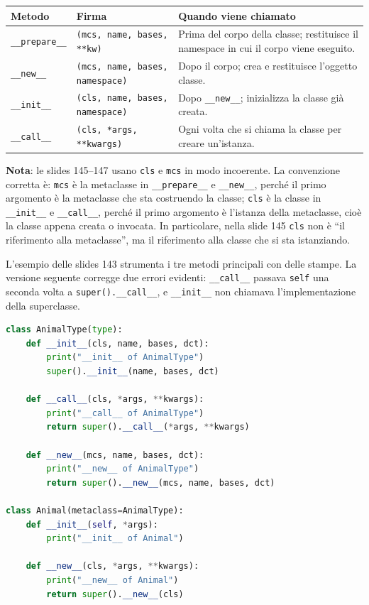 \documentclass[12pt]{extarticle}
\begin{document}
\begin{center}
\small
\begin{tabular}{p{3.4cm}p{6.2cm}p{5.0cm}}
    \toprule
    \textbf{Metodo} & \textbf{Firma} & \textbf{Quando viene chiamato} \\
    \midrule
    \texttt{\_\_prepare\_\_} & \texttt{(mcs, name, bases, **kw)} & Prima del corpo della classe; restituisce il namespace in cui il corpo viene eseguito. \\
    \addlinespace
    \texttt{\_\_new\_\_} & \texttt{(mcs, name, bases, namespace)} & Dopo il corpo; crea e restituisce l'oggetto classe. \\
    \addlinespace
    \texttt{\_\_init\_\_} & \texttt{(cls, name, bases, namespace)} & Dopo \texttt{\_\_new\_\_}; inizializza la classe già creata. \\
    \addlinespace
    \texttt{\_\_call\_\_} & \texttt{(cls, *args, **kwargs)} & Ogni volta che si chiama la classe per creare un'istanza. \\
    \bottomrule
\end{tabular}
\end{center}

\noindent \textbf{Nota}: le slides 145--147 usano \texttt{cls} e \texttt{mcs} in modo incoerente. La convenzione corretta è: \texttt{mcs} è la metaclasse in \texttt{\_\_prepare\_\_} e \texttt{\_\_new\_\_}, perché il primo argomento è la metaclasse che sta costruendo la classe; \texttt{cls} è la classe in \texttt{\_\_init\_\_} e \texttt{\_\_call\_\_}, perché il primo argomento è l'istanza della metaclasse, cioè la classe appena creata o invocata. In particolare, nella slide 145 \texttt{cls} non è ``il riferimento alla metaclasse'', ma il riferimento alla classe che si sta istanziando.

\noindent L'esempio delle slides 143 strumenta i tre metodi principali con delle stampe. La versione seguente corregge due errori evidenti: \texttt{\_\_call\_\_} passava \texttt{self} una seconda volta a \texttt{super().\_\_call\_\_}, e \texttt{\_\_init\_\_} non chiamava l'implementazione della superclasse.

\begin{lstlisting}[language=Python]
class AnimalType(type):
    def __init__(cls, name, bases, dct):
        print("__init__ of AnimalType")
        super().__init__(name, bases, dct)

    def __call__(cls, *args, **kwargs):
        print("__call__ of AnimalType")
        return super().__call__(*args, **kwargs)

    def __new__(mcs, name, bases, dct):
        print("__new__ of AnimalType")
        return super().__new__(mcs, name, bases, dct)

class Animal(metaclass=AnimalType):
    def __init__(self, *args):
        print("__init__ of Animal")

    def __new__(cls, *args, **kwargs):
        print("__new__ of Animal")
        return super().__new__(cls)
\end{lstlisting}
\end{document}

